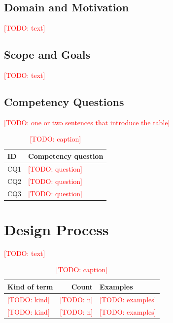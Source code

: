 \documentclass[runningheads]{llncs}
\newcommand{\todo}[1]{\textcolor{red}{[TODO: #1]}}
\begin{document}
\subsection{Domain and Motivation}
\todo{text}

\subsection{Scope and Goals}
\todo{text}

\subsection{Competency Questions}
\todo{one or two sentences that introduce the table}

\begin{table}[t]
\caption{\todo{caption}}
\label{tab:cq}
\centering
\begin{tabularx}{\textwidth}{@{}lX@{}}
\toprule
ID & Competency question \\
\midrule
CQ1 & \todo{question} \\
CQ2 & \todo{question} \\
CQ3 & \todo{question} \\
\bottomrule
\end{tabularx}
\end{table}


\section{Design Process}
\todo{text}

\begin{table}[t]
\caption{\todo{caption}}
\label{tab:terms}
\centering
\begin{tabularx}{\textwidth}{@{}lrX@{}}
\toprule
Kind of term & Count & Examples \\
\midrule
\todo{kind} & \todo{n} & \todo{examples} \\
\todo{kind} & \todo{n} & \todo{examples} \\
\bottomrule
\end{tabularx}
\end{table}
\end{document}
